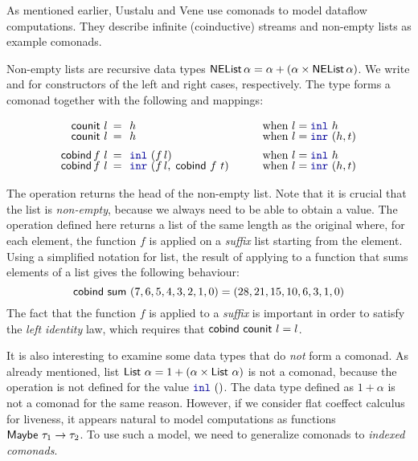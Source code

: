 As mentioned earlier, Uustalu and Vene \cite{comonads-notions} use comonads to model dataflow
computations. They describe infinite (coinductive) streams and non-empty lists as example comonads.

\begin{example}
Non-empty lists are recursive data types $\ident{NEList}\,\alpha = \alpha + (\alpha \times \ident{NEList}\,\alpha)$.
We write  and  for constructors of the left and right cases, respectively. The
type  forms a comonad together with the following  and  mappings:

\begin{equation*}
\begin{array}{rclll}
\ident{counit}~l &\narrow{=}& h &\quad&\textnormal{when}~l=\kvd{inl}~h\\[-0.25em]
\ident{counit}~l &\narrow{=}& h &&\textnormal{when}~l=\kvd{inr}~(h, t)\\[0.5em]
\ident{cobind}\,f~l &\narrow{=}& \kvd{inl}~(f\,l) &&\textnormal{when}~l=\kvd{inl}~h\\[-0.25em]
\ident{cobind}\,f~l &\narrow{=}& \kvd{inr}~(f\,l,\;\ident{cobind}~f~t) &&\textnormal{when}~l=\kvd{inr}~(h, t)
\end{array}
\end{equation*}
\end{example}

\noindent
The  operation returns the head of the non-empty list. Note that it is crucial that
the list is \emph{non-empty}, because we always need to be able to obtain a value. The 
operation defined here returns a list of the same length as the original where, for each element, the
function $f$ is applied on a \emph{suffix} list starting from the element. Using a simplified
notation for list, the result of applying  to a function that sums elements of a
list gives the following behaviour:
%
\begin{equation*}
\textnormal{\sffamily cobind}~\textnormal{\sffamily sum}~(7,6,5,4,3,2,1,0) = (28,21,15,10,6,3,1,0)
\end{equation*}
%
The fact that the function $f$ is applied to a \emph{suffix} is important in order to satisfy the
\emph{left identity} law, which requires that $\textnormal{\sffamily cobind}~\textnormal{\sffamily counit}~l = l$.

It is also interesting to examine some data types that do \emph{not} form a comonad. As already
mentioned, list $\ident{List}~\alpha = 1 + (\alpha \times \ident{List}~\alpha)$ is not a comonad,
because the  operation is not defined for the value $\kvd{inl}~()$. The 
data type defined as $1 + \alpha$ is not a comonad for the same reason. However, if we consider
flat coeffect calculus for liveness, it appears natural to model computations as functions
$\textnormal{\sffamily Maybe}~\tau_1 \rightarrow \tau_2$. To use such a model, we need to generalize comonads
to \emph{indexed comonads}.

